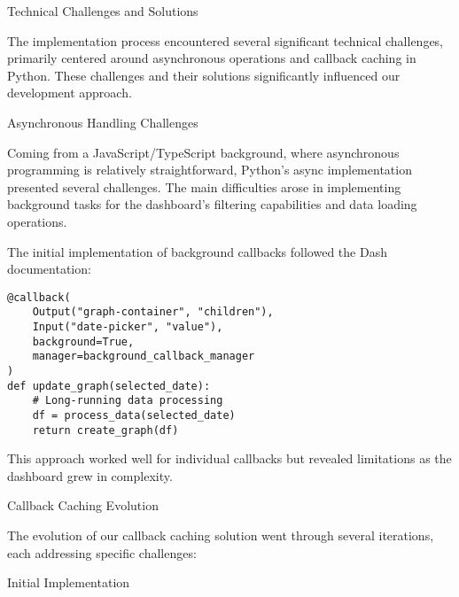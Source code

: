 \begin{section}{Technical Challenges and Solutions}
	\label{sec:implementation-technical-challenges}

	The implementation process encountered several significant technical challenges, primarily centered around asynchronous operations and callback caching in Python. These challenges and their solutions significantly influenced our development approach.

	\begin{subsection}{Asynchronous Handling Challenges}
		\label{subsec:implementation-technical-challenges-async}

		Coming from a JavaScript/TypeScript background, where asynchronous programming is relatively straightforward, Python's async implementation presented several challenges. The main difficulties arose in implementing background tasks for the dashboard's filtering capabilities and data loading operations.

		The initial implementation of background callbacks followed the Dash documentation:

		\begin{listing}[H]
			\caption{Initial Background Callback Implementation}
			\begin{verbatim}
@callback(
    Output("graph-container", "children"),
    Input("date-picker", "value"),
    background=True,
    manager=background_callback_manager
)
def update_graph(selected_date):
    # Long-running data processing
    df = process_data(selected_date)
    return create_graph(df)
			\end{verbatim}
			\label{listing:dashboard-implementation-initial-callback}
		\end{listing}

		This approach worked well for individual callbacks but revealed limitations as the dashboard grew in complexity.

	\end{subsection}

	\begin{subsection}{Callback Caching Evolution}
		\label{subsec:implementation-technical-challenges-caching}

		The evolution of our callback caching solution went through several iterations, each addressing specific challenges:

		\begin{subsubsection}{Initial Implementation}
			\label{subsubsec:implementation-technical-challenges-caching-initial}


\end{subsubsection}
\end{subsection}
\end{section}
